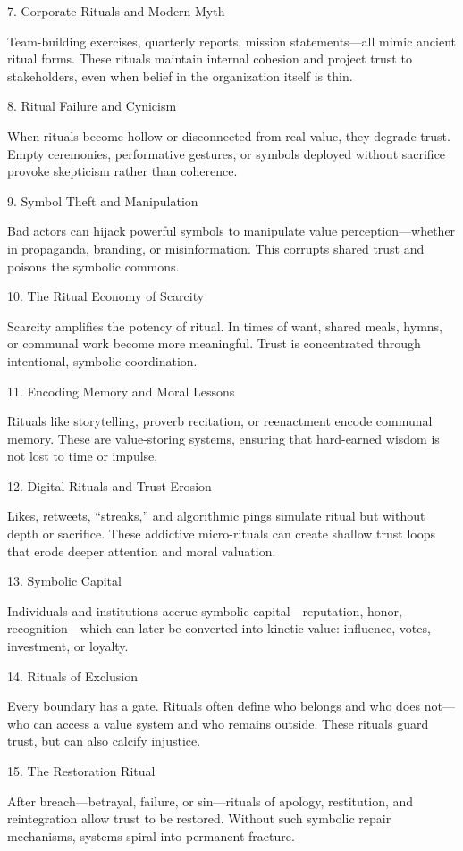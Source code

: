 \documentclass[11pt,oneside]{book}
\begin{document}
7. Corporate Rituals and Modern Myth


Team-building exercises, quarterly reports, mission statements—all mimic ancient ritual forms. These rituals maintain internal cohesion and project trust to stakeholders, even when belief in the organization itself is thin.

8. Ritual Failure and Cynicism


When rituals become hollow or disconnected from real value, they degrade trust. Empty ceremonies, performative gestures, or symbols deployed without sacrifice provoke skepticism rather than coherence.

9. Symbol Theft and Manipulation


Bad actors can hijack powerful symbols to manipulate value perception—whether in propaganda, branding, or misinformation. This corrupts shared trust and poisons the symbolic commons.

10. The Ritual Economy of Scarcity


Scarcity amplifies the potency of ritual. In times of want, shared meals, hymns, or communal work become more meaningful. Trust is concentrated through intentional, symbolic coordination.

11. Encoding Memory and Moral Lessons


Rituals like storytelling, proverb recitation, or reenactment encode communal memory. These are value-storing systems, ensuring that hard-earned wisdom is not lost to time or impulse.

12. Digital Rituals and Trust Erosion


Likes, retweets, “streaks,” and algorithmic pings simulate ritual but without depth or sacrifice. These addictive micro-rituals can create shallow trust loops that erode deeper attention and moral valuation.

13. Symbolic Capital


Individuals and institutions accrue symbolic capital—reputation, honor, recognition—which can later be converted into kinetic value: influence, votes, investment, or loyalty.

14. Rituals of Exclusion


Every boundary has a gate. Rituals often define who belongs and who does not—who can access a value system and who remains outside. These rituals guard trust, but can also calcify injustice.

15. The Restoration Ritual


After breach—betrayal, failure, or sin—rituals of apology, restitution, and reintegration allow trust to be restored. Without such symbolic repair mechanisms, systems spiral into permanent fracture.
\end{document}
